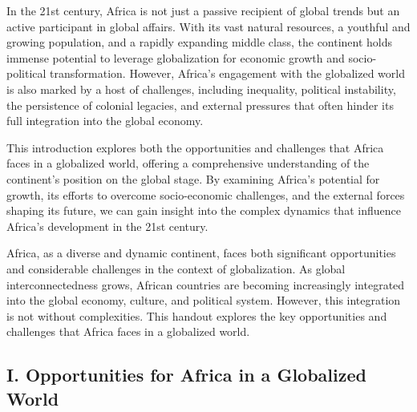 \documentclass[10pt]{article}
\begin{document}
In the 21st century, Africa is not just a passive recipient of global trends but an active participant
in global affairs. With its vast natural resources, a youthful and growing population, and a
rapidly expanding middle class, the continent holds immense potential to leverage globalization
for economic growth and socio-political transformation. However, Africa's engagement with the
globalized world is also marked by a host of challenges, including inequality, political instability,
the persistence of colonial legacies, and external pressures that often hinder its full integration
into the global economy.

This introduction explores both the opportunities and challenges that Africa faces in a
globalized world, offering a comprehensive understanding of the continent's position on the
global stage. By examining Africa's potential for growth, its efforts to overcome socio-economic
challenges, and the external forces shaping its future, we can gain insight into the complex
dynamics that influence Africa's development in the 21st century.

Africa, as a diverse and dynamic continent, faces both significant opportunities and
considerable challenges in the context of globalization. As global interconnectedness grows,
African countries are becoming increasingly integrated into the global economy, culture, and
political system. However, this integration is not without complexities. This handout explores
the key opportunities and challenges that Africa faces in a globalized world.

\subsection*{I. Opportunities for Africa in a Globalized World}
\end{document}
